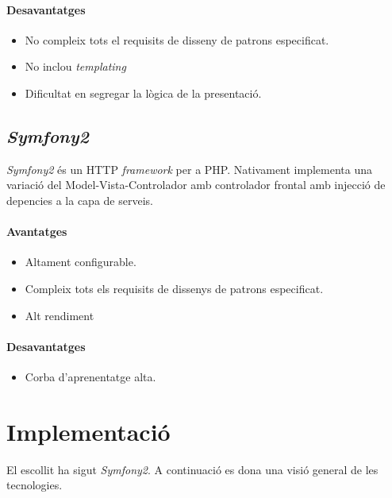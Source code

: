 \paragraph{Desavantatges}
\begin{itemize}
\item No compleix tots el requisits de disseny de patrons especificat.
\item No inclou \textit{templating}
\item Dificultat en segregar la l\`{o}gica de la presentaci\'{o}.
\end{itemize}

\subsection{\textit{Symfony2}}
\textit{Symfony2} \'{e}s un HTTP \textit{framework} per a PHP. Nativament implementa una variaci\'{o} del Model-Vista-Controlador amb controlador frontal amb injecci\'{o} de depencies a la capa de serveis.\cite{symfony}

\paragraph{Avantatges}
\begin{itemize}
\item Altament configurable.
\item Compleix tots els requisits de dissenys de patrons especificat.
\item Alt rendiment
\end{itemize}

\paragraph{Desavantatges}
\begin{itemize}
\item Corba d'aprenentatge alta.
\end{itemize}

\section{Implementaci\'{o}}
El  escollit ha sigut \textit{Symfony2}. A continuaci\'{o} es dona una visi\'{o} general de les tecnologies.


